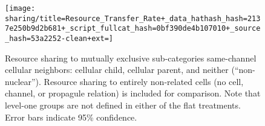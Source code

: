\begin{figure*}[!htbp]
\begin{center}

\texttt{[image: sharing/title=Resource\_Transfer\_Rate+\_data\_hathash\_hash=2137e250b9d2b681+\_script\_fullcat\_hash=0bf390de4b107010+\_source\_hash=53a2252-clean+ext=]}

\caption{
Resource sharing to mutually exclusive sub-categories same-channel cellular neighbors: cellular child, cellular parent, and neither (``non-nuclear'').
Resource sharing to entirely non-related cells (no cell, channel, or propagule relation) is included for comparison.
Note that level-one groups are not defined in either of the flat treatments.
Error bars indicate 95\% confidence.
}
\label{fig:sharing_channelmate}
\end{center}
\end{figure*}
